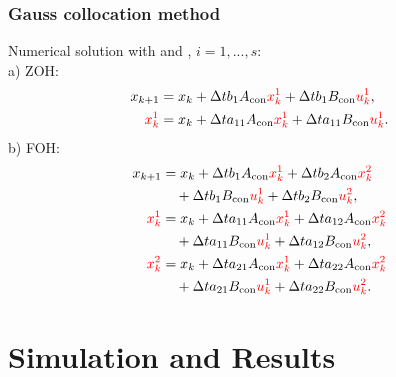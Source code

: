 \documentclass[student, noshadow, lsr, english, aspectratio=169]{ITR_LSR_slides}
\begin{document}
\begin{frame}
	\frametitle{Gauss collocation method}
	Numerical solution with {\color{red}{state stage values $x_k^i$}} and {\color{red}{control stage values $u_k^i$}}, $i = 1,...,s$:
	\\
	a) ZOH: 
	\begin{equation}
		\begin{split}
			x_{k+1}&=x_{k}+\Delta t  b_{1}  A_{\rm{con}}  {\color{red}{x_{k}^{1}}}+\Delta t  b_{1}  B_{\rm{con}}  {\color{red}{u_{k}^{1}}},\\
			{\color{red}{x_{k}^{1}}}&=x_{k}+\Delta t a_{11} A_{\rm{con}} {\color{red}{x_{k}^{1}}}+\Delta t  a_{11} B_{\rm{con}} {\color{red}{u_{k}^{1}}}.
		\end{split}
		\label{zerocoll}
	\end{equation}
    b) FOH:
    \begin{equation}
    	\begin{split}
    		x_{k+1}&=x_{k}+\Delta t  b_{1}  A_{\rm{con}}  {\color{red}{x_{k}^{1}}}+\Delta t  b_{2}  A_{\rm{con}}  {\color{red}{x_{k}^{2}}} \\ & \quad+\Delta t  b_{1}  B_{\rm{con}}  {\color{red}{u_{k}^{1}}}+\Delta t  b_{2}  B_{\rm{con}}  {\color{red}{u_{k}^{2}}}, \\
    		{\color{red}{x_{k}^{1}}}&=x_{k}+\Delta t  a_{11}  A_{\rm{con}}  {\color{red}{x_{k}^{1}}}+\Delta t  a_{12}  A_{\rm{con}}  {\color{red}{x_{k}^{2}}} \\ & \quad +\Delta t  a_{11}  B_{\rm{con}}  {\color{red}{u_{k}^{1}}}+\Delta t  a_{12}  B_{\rm{con}}  {\color{red}{u_{k}^{2}}}, \\
    		{\color{red}{x_{k}^{2}}}&=x_{k}+\Delta t  a_{21}  A_{\rm{con}}  {\color{red}{x_{k}^{1}}}+\Delta t  a_{22}  A_{\rm{con}}  {\color{red}{x_{k}^{2}}} \\ & \quad +\Delta t  a_{21}  B_{\rm{con}}  {\color{red}{u_{k}^{1}}}+\Delta t  a_{22}  B_{\rm{con}} {\color{red}{u_{k}^{2}}}.
    	\end{split}
    \end{equation}

\end{frame}

\section{Simulation and Results}
\end{document}
